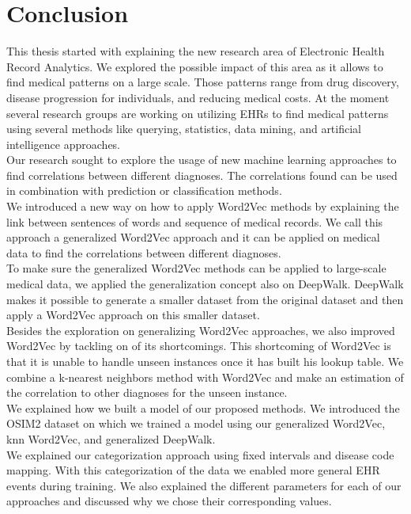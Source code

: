 \chapter{Conclusion}
\label{cha:conclusion}

This thesis started with explaining the new research area of Electronic Health Record Analytics. We explored the possible impact of this area as it allows to find medical patterns on a large scale. Those patterns range from drug discovery, disease progression for individuals, and reducing medical costs. At the moment several research groups are working on utilizing EHRs to find medical patterns using several methods like querying, statistics, data mining, and artificial intelligence approaches. \\
Our research sought to explore the usage of new machine learning approaches to find correlations between different diagnoses. The correlations found can be used in combination with prediction or classification methods. \\

We introduced a new way on how to apply Word2Vec methods by explaining the link between sentences of words and sequence of medical records. We call this approach a generalized Word2Vec approach and it can be applied on medical data to find the correlations between different diagnoses. \\
To make sure the generalized Word2Vec methods can be applied to large-scale medical data, we applied the generalization concept also on DeepWalk. DeepWalk makes it possible to generate a smaller dataset from the original dataset and then apply a Word2Vec approach on this smaller dataset. \\
Besides the exploration on generalizing Word2Vec approaches, we also improved Word2Vec by tackling on of its shortcomings. This shortcoming of Word2Vec is that it is unable to handle unseen instances once it has built his lookup table. We combine a k-nearest neighbors method with Word2Vec and make an estimation of the correlation to other diagnoses for the unseen instance. \\

We explained how we built a model of our proposed methods. We introduced the OSIM2 dataset on which we trained a model using our generalized Word2Vec, knn Word2Vec, and generalized DeepWalk. \\
We explained our categorization approach using fixed intervals and disease code mapping. With this categorization of the data we enabled more general EHR events during training. We also explained the different parameters for each of our approaches and discussed why we chose their corresponding values. \\

